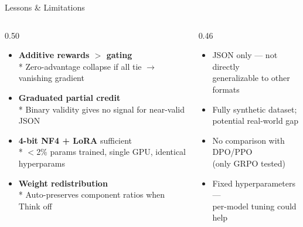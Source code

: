 \documentclass[10pt, aspectratio=169]{beamer}
\begin{document}

\begin{frame}{Lessons \& Limitations}
  \begin{columns}[T]
    \begin{column}{0.50\textwidth}
      \begin{tcolorbox}[insightbox=accent, title={\small\textcolor{accent}{\faCheckCircle}~Technical Lessons}]
        \small
        \begin{itemize}
          \setlength\itemsep{0.45em}
          \item \textbf{Additive rewards $>$ gating}\\*
                {\scriptsize Zero-advantage collapse if all tie $\to$ vanishing gradient}
          \item \textbf{Graduated partial credit}\\*
                {\scriptsize Binary validity gives no signal for near-valid JSON}
          \item \textbf{4-bit NF4 + LoRA} sufficient\\*
                {\scriptsize $<$2\% params trained, single GPU, identical hyperparams}
          \item \textbf{Weight redistribution}\\*
                {\scriptsize Auto-preserves component ratios when Think off}
        \end{itemize}
      \end{tcolorbox}
    \end{column}
    \begin{column}{0.46\textwidth}
      \begin{tcolorbox}[insightbox=gold, title={\small\textcolor{gold}{\faExclamationCircle}~Limitations}]
        \small
        \begin{itemize}
          \setlength\itemsep{0.45em}
          \item JSON only — not directly\\generalizable to other formats
          \item Fully synthetic dataset;\\potential real-world gap
          \item No comparison with DPO/PPO\\(only GRPO tested)
          \item Fixed hyperparameters —\\per-model tuning could help
        \end{itemize}
      \end{tcolorbox}
    \end{column}
  \end{columns}
\end{frame}
\end{document}
